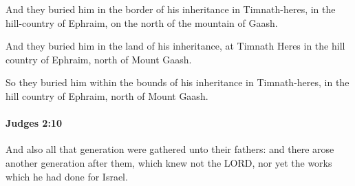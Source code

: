 			\begin{versebox}
					\item[BHS] 
					\item[ASV] And they buried him in the border of his inheritance in Timnath-heres, in the hill-country of Ephraim, on the north of the mountain of Gaash.
					\item[NIV] And they buried him in the land of his inheritance, at Timnath Heres in the hill country of Ephraim, north of Mount Gaash.
					\item[NRSV] So they buried him within the bounds of his inheritance in Timnath-heres, in the hill country of Ephraim, north of Mount Gaash.
			\end{versebox}

		\paragraph{Judges 2:10} %
			\label{JUDGES-2-10}

			And also all that generation were gathered unto their fathers: and there arose another generation after them, which knew not the LORD, nor yet the works which he had done for Israel.

